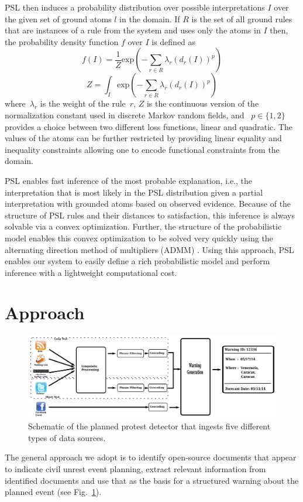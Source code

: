 \documentclass[letterpaper]{article}
\begin{document}
\normalsize
PSL then induces a probability distribution over possible interpretations $\mathit{I}$ over the given set of ground atoms $\mathit{l} $ in the domain. 
If $\mathit{R}$ is the set of all ground rules that are instances of a rule from the system and uses only the atoms in  $\mathit{I}$ then,
the probability density function $\mathit{f}$ over $\mathit{I}$ is defined as
\small
\begin{equation}
\label{eq:contimn1}
    f (I) = \frac{1}{Z} \text{exp}\left(-\sum_{r\in R} \lambda_r (d_r(I))^p\right)
\end{equation}
\begin{equation}
\label{eq:contimn2}
	Z = \int_{I} \text{exp} \left( -\sum_{r\in R} \lambda_r (d_r(I))^p \right)
\end{equation}
\normalsize
where~$\lambda_r$ is the weight of the rule~$r$, $Z$ is the continuous version of the normalization constant used in discrete Markov random fields, and ~$p \in \{1, 2\}$ provides a choice between two different loss functions, linear and quadratic.
The values of the atoms can be further restricted by providing linear equality and inequality constraints allowing one to encode functional constraints from the domain. 

PSL enables fast inference of the most probable explanation, i.e., the interpretation that is most likely in the PSL distribution given a partial interpretation with grounded atoms based on observed evidence. Because of the structure of PSL rules and their distances to satisfaction, this inference is always solvable via a convex optimization. Further, the structure of the probabilistic model enables this convex optimization to be solved very quickly using the alternating direction method of multipliers (ADMM) \cite{boyd:ftml11,bach2012scaling,bach:uai13}. Using this approach, PSL enables our system to easily define a rich probabilistic model and perform inference with a lightweight computational cost. 

\vspace{-0.5em}
\section{Approach}
\begin{figure}
\includegraphics[width=\textwidth]{pipeline}
\vspace{-2em}
\caption{Schematic of the planned protest detector that ingests five
different types of data sources.}
\label{flowchart}
\end{figure}
The general approach we adopt is to identify open-source documents
that appear to indicate civil unrest event planning, extract
relevant information from identified documents and use that as the
basis for a structured warning about the planned event (see Fig.~\ref{flowchart}).
\end{document}
